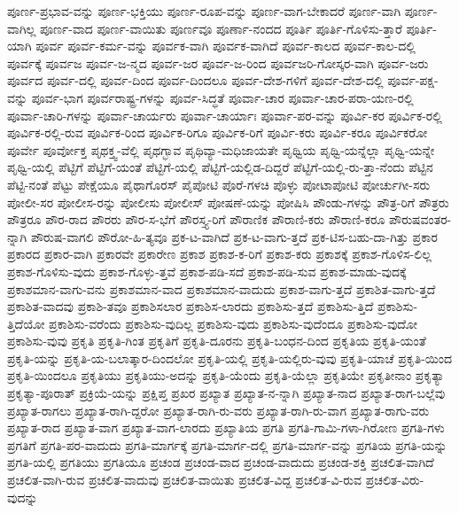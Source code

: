 {ಪೂರ್ಣ-ಪ್ರಭಾವ-ವನ್ನು
ಪೂರ್ಣ-ಭಕ್ತಿಯು
ಪೂರ್ಣ-ರೂಪ-ವನ್ನು
ಪೂರ್ಣ-ವಾಗ-ಬೇಕಾದರೆ
ಪೂರ್ಣ-ವಾಗಿ
ಪೂರ್ಣ-ವಾಗಿಲ್ಲ
ಪೂರ್ಣ-ವಾದ
ಪೂರ್ಣ-ವಾಯಿತು
ಪೂರ್ಣವೂ
ಪೂರ್ಣಾ-ನಂದದ
ಪೂರ್ತಿ
ಪೂರ್ತಿ-ಗೊಳಿಸು-ತ್ತಾರೆ
ಪೂರ್ತಿ-ಯಾಗಿ
ಪೂರ್ವ
ಪೂರ್ವ-ಕರ್ಮ-ವನ್ನು
ಪೂರ್ವಕ-ವಾಗಿ
ಪೂರ್ವಕ-ವಾಗಿದೆ
ಪೂರ್ವ-ಕಾಲದ
ಪೂರ್ವ-ಕಾಲ-ದಲ್ಲಿ
ಪೂರ್ವಕ್ಕೆ
ಪೂರ್ವಜ
ಪೂರ್ವ-ಜ-ನ್ಮದ
ಪೂರ್ವ-ಜರ
ಪೂರ್ವ-ಜ-ರಿಂದ
ಪೂರ್ವಜರಿ-ಗೋಸ್ಕರ-ವಾಗಿ
ಪೂರ್ವ-ಜರು
ಪೂರ್ವದ
ಪೂರ್ವ-ದಲ್ಲಿ
ಪೂರ್ವ-ದಿಂದ
ಪೂರ್ವ-ದಿಂದಲೂ
ಪೂರ್ವ-ದೇಶ-ಗಳಿಗೆ
ಪೂರ್ವ-ದೇಶ-ದಲ್ಲಿ
ಪೂರ್ವ-ಪಕ್ಷ-ವನ್ನು
ಪೂರ್ವ-ಭಾಗ
ಪೂರ್ವರಾಷ್ಟ್ರ-ಗಳನ್ನು
ಪೂರ್ವ-ಸಿದ್ಧತೆ
ಪೂರ್ವಾ-ಚಾರ
ಪೂರ್ವಾ-ಚಾರ-ಪರಾ-ಯಣ-ರಲ್ಲಿ
ಪೂರ್ವಾ-ಚಾರಿ-ಗಳನ್ನು
ಪೂರ್ವಾ-ಚಾರ್ಯರು
ಪೂರ್ವಾ-ಚಾರ್ಯಾಃ
ಪೂರ್ವಾ-ಪರ-ವನ್ನು
ಪೂರ್ವಿ-ಕರ
ಪೂರ್ವಿಕ-ರಲ್ಲಿ
ಪೂರ್ವಿಕ-ರಲ್ಲಿ-ರುವ
ಪೂರ್ವಿಕ-ರಿಂದ
ಪೂರ್ವಿಕ-ರಿಗೂ
ಪೂರ್ವಿಕ-ರಿಗೆ
ಪೂರ್ವಿ-ಕರು
ಪೂರ್ವಿ-ಕರೂ
ಪೂರ್ವಿಕರೋ
ಪೂರ್ವೇ
ಪೂರ್ವೋಕ್ತ
ಪೃಥಕ್ತ್ವ-ವೆಲ್ಲಿ
ಪೃಥಗ್ಭಾವ
ಪೃಥಿವ್ಯಾ-ಮಧಿಜಾಯತೇ
ಪೃಥ್ವಿಯ
ಪೃಥ್ವಿ-ಯನ್ನೆಲ್ಲಾ
ಪೃಥ್ವಿ-ಯನ್ನೇ
ಪೃಥ್ವಿ-ಯಲ್ಲಿ
ಪೆಟ್ಟಿಗೆ
ಪೆಟ್ಟಿಗೆ-ಯಂತೆ
ಪೆಟ್ಟಿಗೆ-ಯಲ್ಲಿ
ಪೆಟ್ಟಿಗೆ-ಯಲ್ಲಿಡ-ದಿದ್ದರೆ
ಪೆಟ್ಟಿಗೆ-ಯಲ್ಲಿ-ರು-ತ್ತಾ-ನೆಂದು
ಪೆಟ್ಟಿನ
ಪೆಟ್ಟಿ-ನಂತೆ
ಪೆಟ್ಟು
ಪೇಕ್ಷೆಯೂ
ಪೈಥಾಗೊರಸ್
ಪೈಪೋಟಿ
ಪೊರೆ-ಗಳಚಿ
ಪೊಳ್ಳು
ಪೋಟಾಪೋಟಿ
ಪೋರ್ಚುಗೀ-ಸರು
ಪೋಲೀ-ಸರ
ಪೋಲೀಸ-ರನ್ನು
ಪೋಲೀಸು
ಪೋಲೀಸ್
ಪೋಷಣೆ-ಯನ್ನು
ಪೋಷಿಸಿ
ಪೌಂಡು-ಗಳನ್ನು
ಪೌತ್ರ-ರಿಗೆ
ಪೌತ್ರರು
ಪೌತ್ರರೂ
ಪೌರ-ರಾದ
ಪೌರರು
ಪೌರ-ಸ-ಭೆಗೆ
ಪೌರಸ್ತ್ಯ-ರಿಗೆ
ಪೌರಾಣಿಕ
ಪೌರಾಣಿ-ಕರು
ಪೌರಾಣಿ-ಕರೂ
ಪೌರುಷವಂತರ-ನ್ನಾಗಿ
ಪೌರುಷ-ವಾಗಲಿ
ಪೌರೋ-ಹಿ-ತ್ಯವೂ
ಪ್ರಕ-ಟ-ವಾಗಿದೆ
ಪ್ರಕ-ಟ-ವಾಗು-ತ್ತದೆ
ಪ್ರಕ-ಟಿಸ-ಬಹು-ದಾ-ಗಿತ್ತು
ಪ್ರಕಾರ
ಪ್ರಕಾರದ
ಪ್ರಕಾರ-ವಾಗಿ
ಪ್ರಕಾರವೇ
ಪ್ರಕಾರೇಣ
ಪ್ರಕಾಶ
ಪ್ರಕಾಶ-ಕ-ರಿಗೆ
ಪ್ರಕಾಶ-ಕರು
ಪ್ರಕಾಶಕ್ಕೆ
ಪ್ರಕಾಶ-ಗೊಳಿಸ-ಲಿಲ್ಲ
ಪ್ರಕಾಶ-ಗೊಳಿಸು-ವುದು
ಪ್ರಕಾಶ-ಗೊಳ್ಳು-ತ್ತವೆ
ಪ್ರಕಾಶ-ಪಡಿ-ಸದೆ
ಪ್ರಕಾಶ-ಪಡಿ-ಸುವ
ಪ್ರಕಾಶ-ಮಾಡು-ವುದಕ್ಕೆ
ಪ್ರಕಾಶಮಾನ-ವಾಗು-ವನು
ಪ್ರಕಾಶಮಾನ-ವಾದ
ಪ್ರಕಾಶಮಾನ-ವಾದುದು
ಪ್ರಕಾಶ-ವಾಗು-ತ್ತದೆ
ಪ್ರಕಾಶಿತ-ವಾಗು-ತ್ತದೆ
ಪ್ರಕಾಶಿತ-ವಾದವು
ಪ್ರಕಾಶಿ-ತವೂ
ಪ್ರಕಾಶಿಸಲಾರ
ಪ್ರಕಾಶಿಸ-ಲಾರದು
ಪ್ರಕಾಶಿಸು-ತ್ತದೆ
ಪ್ರಕಾಶಿಸು-ತ್ತಿದೆ
ಪ್ರಕಾಶಿಸು-ತ್ತಿದೆಯೋ
ಪ್ರಕಾಶಿಸು-ವರೆಂದು
ಪ್ರಕಾಶಿಸು-ವುದಿಲ್ಲ
ಪ್ರಕಾಶಿಸು-ವುದು
ಪ್ರಕಾಶಿಸು-ವುದೆಂದೂ
ಪ್ರಕಾಶಿಸು-ವುದೋ
ಪ್ರಕಾಶಿಸು-ವುವು
ಪ್ರಕೃತಿ
ಪ್ರಕೃತಿ-ಗಿಂತ
ಪ್ರಕೃತಿಗೆ
ಪ್ರಕೃತಿ-ದೂರನು
ಪ್ರಕೃತಿ-ಬಂಧನ-ದಿಂದ
ಪ್ರಕೃತಿಯ
ಪ್ರಕೃತಿ-ಯಂತೆ
ಪ್ರಕೃತಿ-ಯನ್ನು
ಪ್ರಕೃತಿ-ಯ-ಬಲಾತ್ಕಾರ-ದಿಂದಲೋ
ಪ್ರಕೃತಿ-ಯಲ್ಲಿ
ಪ್ರಕೃತಿ-ಯಲ್ಲಿರು-ವುವು
ಪ್ರಕೃತಿ-ಯಾಚೆ
ಪ್ರಕೃತಿ-ಯಿಂದ
ಪ್ರಕೃತಿ-ಯಿಂದಲೂ
ಪ್ರಕೃತಿಯು
ಪ್ರಕೃತಿಯು-ಅದನ್ನು
ಪ್ರಕೃತಿ-ಯೆಂದು
ಪ್ರಕೃತಿ-ಯೆಲ್ಲಾ
ಪ್ರಕೃತಿಯೇ
ಪ್ರಕೃತೀನಾಂ
ಪ್ರಕೃತ್ಯಾ
ಪ್ರಕೃತ್ಯಾ-ಪೂರಾತ್
ಪ್ರಕ್ರಿಯೆ-ಯನ್ನು
ಪ್ರಕ್ಷಿಪ್ತ
ಪ್ರಖರ
ಪ್ರಖ್ಯಾತ
ಪ್ರಖ್ಯಾತ-ನ-ನ್ನಾಗಿ
ಪ್ರಖ್ಯಾತ-ನಾದ
ಪ್ರಖ್ಯಾತ-ರಾಗ-ಬಲ್ಲೆವು
ಪ್ರಖ್ಯಾತ-ರಾಗಲು
ಪ್ರಖ್ಯಾತ-ರಾಗಿ-ದ್ದರೋ
ಪ್ರಖ್ಯಾತ-ರಾಗಿ-ರು-ವರು
ಪ್ರಖ್ಯಾತ-ರಾಗಿ-ರು-ವಾಗ
ಪ್ರಖ್ಯಾತ-ರಾಗು-ವರು
ಪ್ರಖ್ಯಾತ-ರಾದ
ಪ್ರಖ್ಯಾತ-ವಾಗ
ಪ್ರಖ್ಯಾತ-ವಾಗ-ಲಾರದು
ಪ್ರಖ್ಯಾತಿಯ
ಪ್ರಗತಿ
ಪ್ರಗತಿ-ಗಾಮಿ-ಗಳಾ-ಗಿರೋಣ
ಪ್ರಗತಿ-ಗಳು
ಪ್ರಗತಿಗೆ
ಪ್ರಗತಿ-ಪರ-ವಾದುದು
ಪ್ರಗತಿ-ಮಾರ್ಗಕ್ಕೆ
ಪ್ರಗತಿ-ಮಾರ್ಗ-ದಲ್ಲಿ
ಪ್ರಗತಿ-ಮಾರ್ಗ-ವನ್ನು
ಪ್ರಗತಿಯ
ಪ್ರಗತಿ-ಯನ್ನು
ಪ್ರಗತಿ-ಯಲ್ಲಿ
ಪ್ರಗತಿಯು
ಪ್ರಗತಿಯೂ
ಪ್ರಚಂಡ
ಪ್ರಚಂಡ-ವಾದ
ಪ್ರಚಂಡ-ವಾದುದು
ಪ್ರಚಂಡ-ಶಕ್ತಿ
ಪ್ರಚಲಿತ-ವಾಗಿದೆ
ಪ್ರಚಲಿತ-ವಾಗಿ-ರುವ
ಪ್ರಚಲಿತ-ವಾದುವು
ಪ್ರಚಲಿತ-ವಾಯಿತು
ಪ್ರಚಲಿತ-ವಿದ್ದ
ಪ್ರಚಲಿತ-ವಿ-ರುವ
ಪ್ರಚಲಿತ-ವಿರು-ವುದನ್ನು
}

